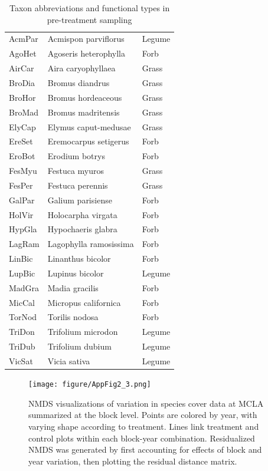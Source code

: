 \documentclass[twoside,12pt,final]{ucthesis-CA2012}
\begin{document}
\begin{ucmainmatter}
\begin{table}[ht]
\begin{tabular}{lll}
  \hline
AcmPar & Acmispon parviflorus & Legume \\ 
  AgoHet & Agoseris heterophylla & Forb \\ 
  AirCar & Aira caryophyllaea & Grass \\ 
  BroDia & Bromus diandrus & Grass \\ 
  BroHor & Bromus hordeaceous & Grass \\ 
  BroMad & Bromus madritensis & Grass \\ 
  ElyCap & Elymus caput-medusae & Grass \\ 
  EreSet & Eremocarpus setigerus & Forb \\ 
  EroBot & Erodium botrys & Forb \\ 
  FesMyu & Festuca myuros & Grass \\ 
  FesPer & Festuca perennis & Grass \\ 
  GalPar & Galium parisiense & Forb \\ 
  HolVir & Holocarpha virgata & Forb \\ 
  HypGla & Hypochaeris glabra & Forb \\ 
  LagRam & Lagophylla ramosissima & Forb \\ 
  LinBic & Linanthus bicolor & Forb \\ 
  LupBic & Lupinus bicolor & Legume \\ 
  MadGra & Madia gracilis & Forb \\ 
  MicCal & Micropus californica & Forb \\ 
  TorNod & Torilis nodosa & Forb \\ 
  TriDon & Trifolium microdon & Legume \\ 
  TriDub & Trifolium dubium & Legume \\ 
  VicSat & Vicia sativa & Legume \\ 
   \hline
\end{tabular}
\caption{Taxon abbreviations and functional types in pre-treatment sampling} 
\end{table}
\begin{figure}
\centering
\texttt{[image: figure/AppFig2\_3.png]}
\caption{NMDS visualizations of variation in species cover data at MCLA summarized at the block level. Points are colored by year, with varying shape according to treatment. Lines link treatment and control plots within each block-year combination. Residualized NMDS was generated by first accounting for effects of block and year variation, then plotting the residual distance matrix. \label{app-2-3}}
\end{figure}

\end{ucmainmatter}
\end{document}
